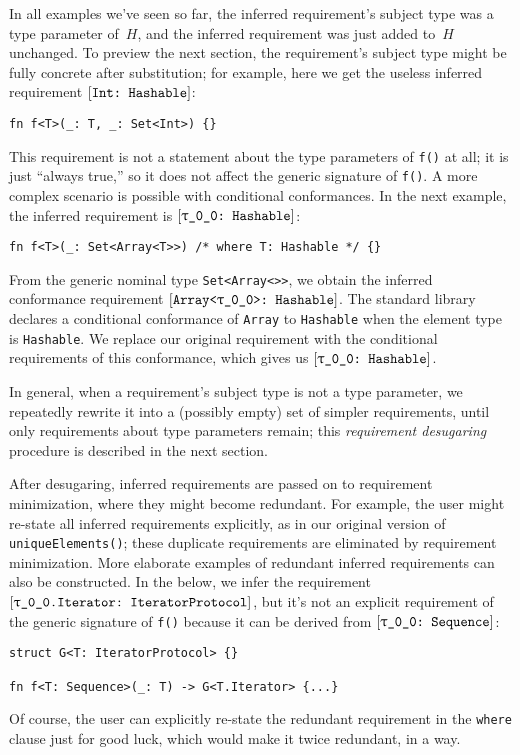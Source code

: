 \documentclass[../generics]{subfiles}
\begin{document}
In all examples we've seen so far, the inferred requirement's subject type was a type parameter of~$H$, and the inferred requirement was just added to~$H$ unchanged. To preview the next section, the requirement's subject type might be fully concrete after substitution; for example, here we get the useless inferred requirement $[\texttt{Int:~Hashable}]$:
\begin{Verbatim}
fn f<T>(_: T, _: Set<Int>) {}
\end{Verbatim}
This requirement is not a statement about the type parameters of \texttt{f()} at all; it is just ``always true,'' so it does not affect the generic signature of \texttt{f()}. A more complex scenario is possible with conditional conformances. In the next example, the inferred requirement is $\ConfReq{\rT}{Hashable}$:
\begin{Verbatim}
fn f<T>(_: Set<Array<T>>) /* where T: Hashable */ {}
\end{Verbatim}
From the generic nominal type \texttt{Set<Array<\rT>>}, we obtain the inferred conformance requirement $\ConfReq{Array<\rT>}{Hashable}$. The standard library declares a conditional conformance of \texttt{Array} to \texttt{Hashable} when the element type is \texttt{Hashable}. We replace our original requirement with the conditional requirements of this conformance, which gives us $\ConfReq{\rT}{Hashable}$.

In general, when a requirement's subject type is not a type parameter, we repeatedly rewrite it into a (possibly empty) set of simpler requirements, until only requirements about type parameters remain; this \emph{requirement desugaring} procedure is described in the next section.

After desugaring, inferred requirements are passed on to requirement minimization, where they might become redundant. For example, the user might re-state all inferred requirements explicitly, as in our original version of \texttt{uniqueElements()}; these duplicate requirements are eliminated by requirement minimization. More elaborate examples of redundant inferred requirements can also be constructed. In the below, we infer the requirement $\ConfReq{\rT.Iterator}{IteratorProtocol}$, but it's not an explicit requirement of the generic signature of \texttt{f()} because it can be derived from $\rTSequence$:
\begin{Verbatim}
struct G<T: IteratorProtocol> {}

fn f<T: Sequence>(_: T) -> G<T.Iterator> {...}
\end{Verbatim}
Of course, the user can explicitly re-state the redundant requirement in the \texttt{where} clause just for good luck, which would make it twice redundant, in a way.
\end{document}
